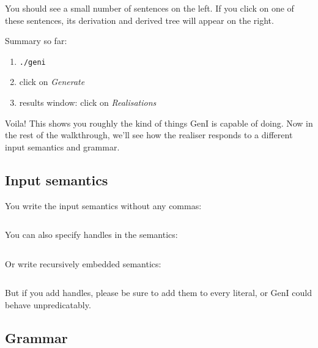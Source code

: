 \documentclass[11pt]{article}
\newcommand{\commandline}{\texttt}
\newcommand{\commandgui}{\textit}
\begin{document}
You should see a small number of sentences on the left. If you click on
one of these sentences, its derivation and derived tree will appear on
the right.

Summary so far:

\begin{enumerate}
\item \commandline{./geni}
\item click on \commandgui{Generate}
\item results window: click on \commandgui{Realisations}
\end{enumerate}

Voila! This shows you roughly the kind of things GenI is capable of
doing.  Now in the rest of the walkthrough, we'll see how the realiser
responds to a different input semantics and grammar.

\subsection{Input semantics}

You write the input semantics without any commas:
\begin{verbatim}
\end{verbatim}

You can also specify handles in the semantics:
\begin{verbatim}
\end{verbatim}

Or write recursively embedded semantics:
\begin{verbatim}
\end{verbatim}

But if you add handles, please be sure to add them to every literal,
or GenI could behave unpredicatably.

\subsection{Grammar}

%
%
\end{document}
